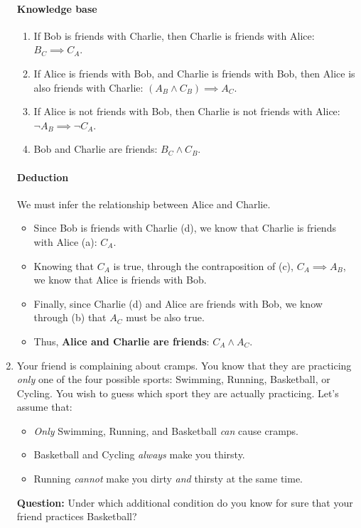 \documentclass[11pt]{article}
\numberwithin{equation}{section}
\newcommand{\sol}[1]{
    }
\begin{document}
\begin{enumerate}
{        \paragraph{Knowledge base}
        \begin{enumerate}
            \item If Bob is friends with Charlie, then Charlie is friends with Alice: $B_C \implies C_A$.
            \item If Alice is friends with Bob, and Charlie is friends with Bob, then Alice is also friends with Charlie: $(A_B \land C_B) \implies A_C$.
            \item If Alice is not friends with Bob, then Charlie is not friends with Alice: $\neg A_B \implies \neg C_A$.
            \item Bob and Charlie are friends: $B_C \land C_B$.
        \end{enumerate}

        \paragraph{Deduction}
        We must infer the relationship between Alice and Charlie.
        \begin{itemize}
            \item Since Bob is friends with Charlie (d), we know that Charlie is friends with Alice (a): $C_A$.
            \item Knowing that $C_A$ is true, through the contraposition of (c), $C_A \implies A_B$, we know that Alice is friends with Bob.
            \item Finally, since Charlie (d) and Alice are friends with Bob, we know through (b) that $A_C$ must be also true.
            \item Thus, \textbf{Alice and Charlie are friends}: $C_A \land A_C$.
        \end{itemize}
    }
    \fi

    \item Your friend is complaining about cramps. You know that they are practicing \emph{only} one of the four possible sports: Swimming, Running, Basketball, or Cycling.
    You wish to guess which sport they are actually practicing. Let's assume that:
    \begin{itemize}
        \item \emph{Only} Swimming, Running, and Basketball \emph{can} cause cramps.
        \item Basketball and Cycling \emph{always} make you thirsty.
        \item Running \emph{cannot} make you dirty \emph{and} thirsty at the same time.
    \end{itemize}
    \textbf{Question:} Under which additional condition do you know for sure that your friend practices Basketball?
    \sol{

}
\end{enumerate}
\end{document}
